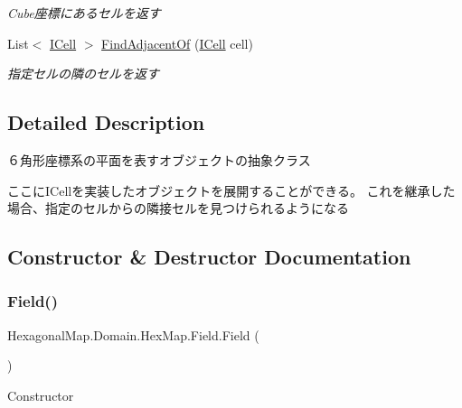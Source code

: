 \begin{DoxyCompactItemize}
\begin{DoxyCompactList}\small\item\em Cube座標にあるセルを返す \end{DoxyCompactList}\item 
List$<$ \mbox{\hyperlink{interface_hexagonal_map_1_1_domain_1_1_hex_map_1_1_i_cell}{I\+Cell}} $>$ \mbox{\hyperlink{class_hexagonal_map_1_1_domain_1_1_hex_map_1_1_field_afce23434d637e17aaef285c5b4b9440b}{Find\+Adjacent\+Of}} (\mbox{\hyperlink{interface_hexagonal_map_1_1_domain_1_1_hex_map_1_1_i_cell}{I\+Cell}} cell)
\begin{DoxyCompactList}\small\item\em 指定セルの隣のセルを返す \end{DoxyCompactList}\end{DoxyCompactItemize}


\subsection{Detailed Description}
６角形座標系の平面を表すオブジェクトの抽象クラス 

ここに\+I\+Cellを実装したオブジェクトを展開することができる。 これを継承した場合、指定のセルからの隣接セルを見つけられるようになる 

\subsection{Constructor \& Destructor Documentation}
\mbox{\label{class_hexagonal_map_1_1_domain_1_1_hex_map_1_1_field_ac69714e5b08a8cdddf5d3a2f3aa27b71}} 
\subsubsection{\texorpdfstring{Field()}{Field()}}
{\footnotesize\ttfamily Hexagonal\+Map.\+Domain.\+Hex\+Map.\+Field.\+Field (\begin{DoxyParamCaption}{ }\end{DoxyParamCaption})\hspace{0.3cm}{\ttfamily [inline]}}



Constructor 



